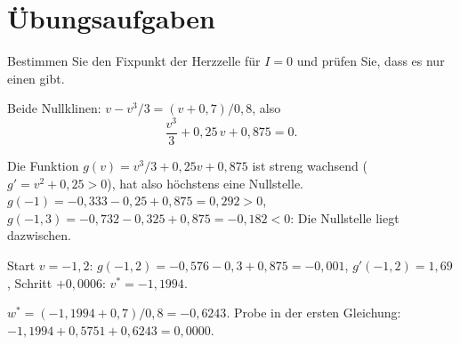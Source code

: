 \section{Übungsaufgaben}

\begin{aufgabe}
Bestimmen Sie den Fixpunkt der Herzzelle für $I = 0$ und prüfen Sie, dass es nur einen gibt.

\loesung
{}
Beide Nullklinen: $v - v^{3}/3 = (v + 0{,}7)/0{,}8$, also
\[ \frac{v^{3}}{3} + 0{,}25\,v + 0{,}875 = 0 . \]

Die Funktion $g(v) = v^{3}/3 + 0{,}25v + 0{,}875$ ist streng wachsend ($g' = v^{2} + 0{,}25 > 0$), hat also höchstens eine Nullstelle. $g(-1) = -0{,}333 - 0{,}25 + 0{,}875 = 0{,}292 > 0$, $g(-1{,}3) = -0{,}732 - 0{,}325 + 0{,}875 = -0{,}182 < 0$: Die Nullstelle liegt dazwischen.

Start $v = -1{,}2$: $g(-1{,}2) = -0{,}576 - 0{,}3 + 0{,}875 = -0{,}001$, $g'(-1{,}2) = 1{,}69$, Schritt $+0{,}0006$: $v^{*} = -1{,}1994$.

$w^{*} = (-1{,}1994 + 0{,}7)/0{,}8 = -0{,}6243$. Probe in der ersten Gleichung: $-1{,}1994 + 0{,}5751 + 0{,}6243 = 0{,}0000$. \checkmark

\begin{center}
\begin{minipage}{0.88\textwidth}
\end{minipage}
\end{center}
\end{aufgabe}

